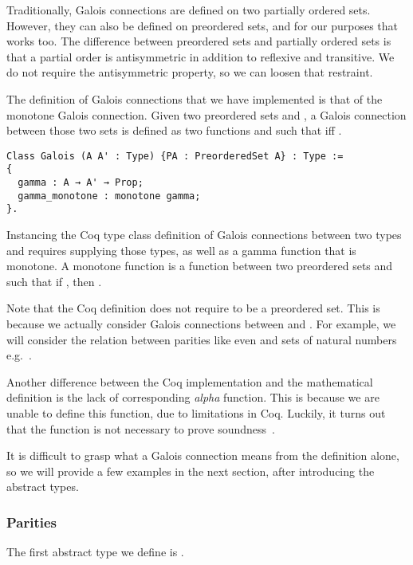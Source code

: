 Traditionally, Galois connections are defined on two partially ordered sets.
However, they can also be defined on preordered sets, and for our purposes that
works too. 
The difference between preordered sets and partially ordered sets is
that a partial order is antisymmetric in addition to reflexive and transitive.
We do not require the antisymmetric property, so we can loosen that restraint.

The definition of Galois connections that we have implemented is that of the
monotone Galois connection. Given two preordered sets  and
, a Galois connection between those two sets is defined as two
functions  and  such that 
 iff .

\begin{verbatim}
Class Galois (A A' : Type) {PA : PreorderedSet A} : Type :=
{
  gamma : A → A' → Prop;
  gamma_monotone : monotone gamma;
}.
\end{verbatim}

Instancing the Coq type class definition of Galois connections between two
types  and  requires supplying those types, as well as a gamma 
function  that is monotone. 
A monotone function   is
a function between two preordered sets  and  such that if 
, then .

Note that the Coq definition does not require  to be a preordered set. 
This is because we actually consider Galois connections between 
 and . For example, we will consider the relation between 
parities like even and sets of natural numbers e.g.\ .

Another difference between the Coq implementation and the mathematical
definition is the lack of corresponding \textit{alpha} function. This is
because we are unable to define this function, due to limitations in Coq.
Luckily, it turns out that the  function is not necessary to prove
soundness~\cite{jourdan2016verasco}.

It is difficult to grasp what a Galois connection means from the definition
alone, so we will provide a few examples in the next section, after
introducing the abstract types.

\subsubsection{Parities}
The first abstract type we define is .

